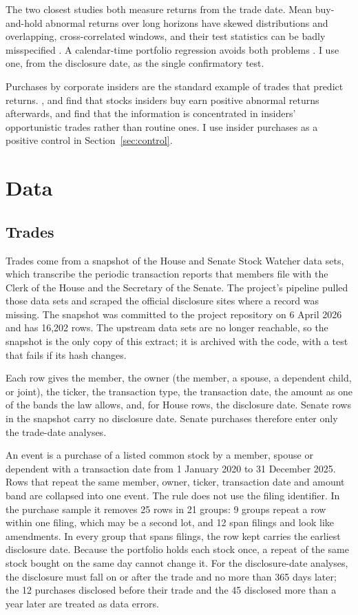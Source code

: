 \documentclass[11pt]{article}
\begin{document}
The two closest studies both measure returns from the trade date. Mean buy-and-hold abnormal returns over long horizons have skewed distributions and overlapping, cross-correlated windows, and their test statistics can be badly misspecified \citep{lyon1999improved,mitchell2000managerial}. A calendar-time portfolio regression avoids both problems \citep{fama1998market}. I use one, from the disclosure date, as the single confirmatory test.

Purchases by corporate insiders are the standard example of trades that predict returns. \citet{seyhun1986insiders}, \citet{lakonishok2001insider} and \citet{jeng2003estimating} find that stocks insiders buy earn positive abnormal returns afterwards, and \citet{cohen2012decoding} find that the information is concentrated in insiders' opportunistic trades rather than routine ones. I use insider purchases as a positive control in Section~\ref{sec:control}.

\section{Data}\label{sec:data}

\subsection{Trades}

Trades come from a snapshot of the House and Senate Stock Watcher data sets, which transcribe the periodic transaction reports that members file with the Clerk of the House and the Secretary of the Senate. The project's pipeline pulled those data sets and scraped the official disclosure sites where a record was missing. The snapshot was committed to the project repository on 6 April 2026 and has 16,202 rows. The upstream data sets are no longer reachable, so the snapshot is the only copy of this extract; it is archived with the code, with a test that fails if its hash changes.

Each row gives the member, the owner (the member, a spouse, a dependent child, or joint), the ticker, the transaction type, the transaction date, the amount as one of the bands the law allows, and, for House rows, the disclosure date. Senate rows in the snapshot carry no disclosure date. Senate purchases therefore enter only the trade-date analyses.

An event is a purchase of a listed common stock by a member, spouse or dependent with a transaction date from 1 January 2020 to 31 December 2025. Rows that repeat the same member, owner, ticker, transaction date and amount band are collapsed into one event. The rule does not use the filing identifier. In the purchase sample it removes 25 rows in 21 groups: 9 groups repeat a row within one filing, which may be a second lot, and 12 span filings and look like amendments. In every group that spans filings, the row kept carries the earliest disclosure date. Because the portfolio holds each stock once, a repeat of the same stock bought on the same day cannot change it. For the disclosure-date analyses, the disclosure must fall on or after the trade and no more than 365 days later; the 12 purchases disclosed before their trade and the 45 disclosed more than a year later are treated as data errors.
\end{document}
